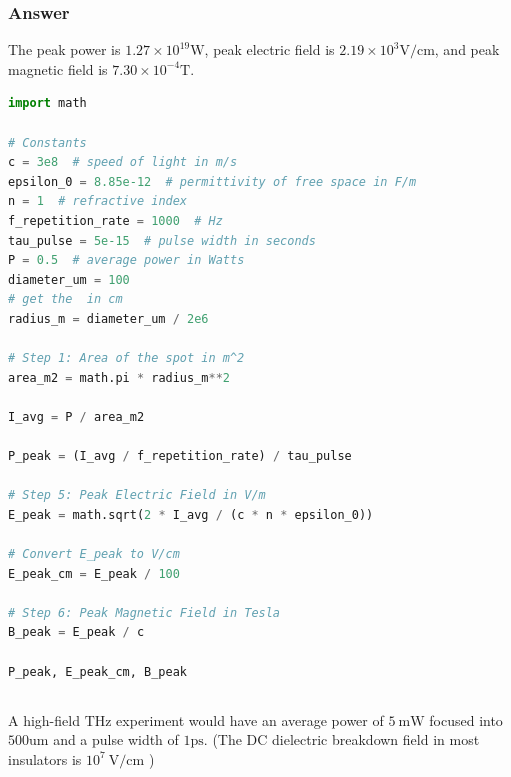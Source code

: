 \documentclass[12pt]{article}
\begin{document}
\subsubsection{Answer}
The peak power is $1.27 \times 10^{19} \mathrm{W}$, peak electric field is $2.19 \times 10^{3} \mathrm{V} / \mathrm{cm}$, and peak magnetic field is $7.30 \times 10^{-4} \mathrm{T}$.

\begin{lstlisting}[language=Python]
import math

# Constants
c = 3e8  # speed of light in m/s
epsilon_0 = 8.85e-12  # permittivity of free space in F/m
n = 1  # refractive index
f_repetition_rate = 1000  # Hz
tau_pulse = 5e-15  # pulse width in seconds
P = 0.5  # average power in Watts
diameter_um = 100
# get the  in cm
radius_m = diameter_um / 2e6

# Step 1: Area of the spot in m^2
area_m2 = math.pi * radius_m**2

I_avg = P / area_m2

P_peak = (I_avg / f_repetition_rate) / tau_pulse

# Step 5: Peak Electric Field in V/m
E_peak = math.sqrt(2 * I_avg / (c * n * epsilon_0))

# Convert E_peak to V/cm
E_peak_cm = E_peak / 100

# Step 6: Peak Magnetic Field in Tesla
B_peak = E_peak / c

P_peak, E_peak_cm, B_peak

\end{lstlisting}
\subsection{}
A high-field $\mathrm{THz}$ experiment would have an average power of $5 \mathrm{~mW}$ focused into $500 \mathrm{um}$ and a pulse width of $1 \mathrm{ps}$. (The DC dielectric breakdown field in most insulators is $10^{7} \mathrm{~V} / \mathrm{cm}$ )
\end{document}
